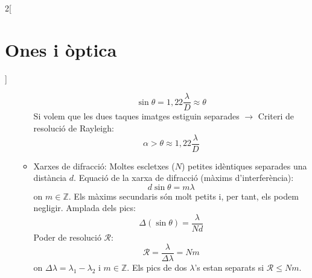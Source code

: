 \documentclass[../../../main.tex]{subfiles}
\begin{document}
\begin{multicols}{2}[\section{Ones i òptica}]
\begin{itemize}
\begin{itemize}
\begin{minipage}{\linewidth}
                    $$\sin\theta=1,22\frac{\lambda}{D}\approx\theta$$
                    Si volem que les dues taques imatges estiguin separades $\rightarrow$
                    Criteri de resolució de Rayleigh: $$\alpha>\theta\approx1,22\frac{\lambda}{D}$$
                  \end{minipage}
            \item Xarxes de difracció: Moltes escletxes ($N$) petites idèntiques separades una distància $d$.\newline
                  Equació de la xarxa de difracció (màxims d'interferència): $$d\sin\theta=m\lambda$$ {\footnotesize on $m\in\mathbb{Z}$.}\newline
                  Els màxims secundaris són molt petits i, per tant, els podem ne\-gli\-gir.\newline
                  Amplada dels pics: $$\Delta(\sin\theta)=\frac{\lambda}{Nd}$$
                  Poder de resolució $\mathcal{R}$: $$\mathcal{R}=\frac{\lambda}{\Delta\lambda}=Nm$$ {\footnotesize on $\Delta\lambda=\lambda_1-\lambda_2$ i $m\in\mathbb{Z}$.}\newline
                  Els pics de dos $\lambda$'s estan separats si $\mathcal{R}\leq Nm$.
          \end{itemize}
  \end{itemize}
\end{multicols}
\end{document}
